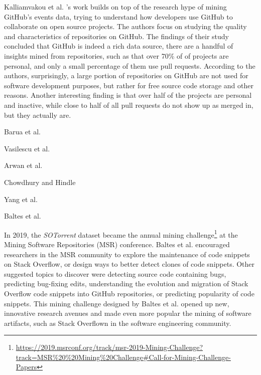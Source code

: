         Kalliamvakou et al. \cite{kalliamvakou2014promises}'s work builds on top of the research hype of mining GitHub's events data, trying to understand how developers use GitHub to collaborate on open source projects. The authors focus on studying the quality and characteristics of repositories on GitHub. The findings of their study concluded that GitHub is indeed a rich data source, there are a handful of insights mined from repositories, such as that over 70\% of of projects are personal, and only a small percentage of them use pull requests. According to the authors, surprisingly, a large portion of repositories on GitHub are not used for software development purposes, but rather for free source code storage and other reasons. Another interesting finding is that over half of the projects are personal and inactive, while close to half of all pull requests do not show up as merged in, but they actually are.
        
        Barua et al. \cite{barua2014developers}
        
        Vasilescu et al. \cite{vasilescu2014social}
        
        Arwan et al. \cite{arwan2015source}
        
        Chowdhury and Hindle \cite{chowdhury2015mining}
        
        Yang et al. \cite{yang2017stack}
        
        Baltes et al. \cite{baltes2018sotorrent}
        
        In 2019, the \emph{SOTorrent} dataset became the annual mining challenge\footnote{\url{https://2019.msrconf.org/track/msr-2019-Mining-Challenge?track=MSR\%20\%20Mining\%20Challenge\#Call-for-Mining-Challenge-Papers}} at the Mining Software Repositories (MSR) conference. Baltes et al. \cite{baltes2019sotorrent} encouraged researchers in the MSR community to explore the maintenance of code snippets on Stack Overflow, or design ways to better detect clones of code snippets. Other suggested topics to discover were detecting source code containing bugs, predicting bug-fixing edits, understanding the evolution and migration of Stack Overflow code snippets into GitHub repositories, or predicting popularity of code snippets. This mining challenge designed by Baltes et al. \cite{baltes2019sotorrent} opened up new, innovative research avenues and made even more popular the mining of software artifacts, such as Stack Overflown in the software engineering community. 
        
